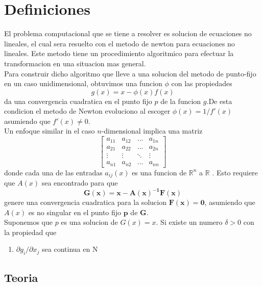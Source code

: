 \documentclass[11pt]{article}
\begin{document}
\section{Definiciones}

El problema computacional que se tiene a resolver es solucion de ecuaciones no lineales, el cual sera resuelto con el metodo de newton para ecuaciones no lineales. Este metodo tiene un procedimiento algoritmico para efectuar la transformacion en una situacion mas general.\\

Para construir dicho algoritmo que lleve a una solucion del metodo de punto-fijo en un caso unidimensional, obtuvimos una funcion $\phi$ con las propiedades $$g(x)=x-\phi(x)f(x)$$ da una convergencia cuadratica en el punto fijo $p$ de la funcion $g$.De esta condicion el metodo de Newton evoluciono al escoger $\phi(x)=1/f'(x)$ asumiendo que $f'(x)\neq0$.\\

Un enfoque similar in el caso $n$-dimensional implica una matriz
\[
\begin{bmatrix}
    a_{11}       & a_{12} & \dots & a_{1n} \\
    a_{21}       & a_{22} & \dots & a_{2n} \\
    \vdots & \vdots & \ddots  & \vdots\\
    a_{n1}       & a_{n2} & \dots & a_{nn}
\end{bmatrix}
\]
donde cada una de las entradas $a_{ij}(x)$ es una funcion de $\mathbb{R}^n$ a $\mathbb{R}$ . Esto requiere que $A(x)$ sea encontrado para que $$\mathbf{G(x)=x-A(x)^{-1}F(x)}$$ genere una convergencia cuadratica para la solucion $\mathbf{F(x)=0}$, asumiendo que $A(x)$ es no singular en el punto fijo $\mathbf{p}$ de $\mathbf{G}$.\\

Suponemos que $p$ es una solucion de $G(x)=x$. Si existe un numero $\delta>0$ con la propiedad que

\begin{enumerate}[label=(\roman*)]

	\item $\partial g_i / \partial x_j$ sea continua en N

\end{enumerate}

\subsection{Teoria}
\end{document}

